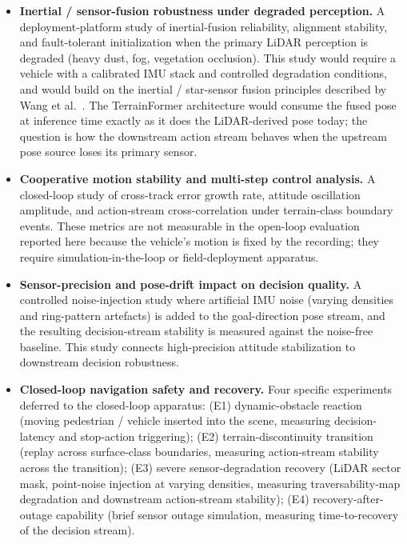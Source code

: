\documentclass[sensors,article,submit,pdftex,moreauthors]{Definitions/mdpi}
\begin{document}
\begin{itemize}
    \item \textbf{Inertial / sensor-fusion robustness under degraded perception.} A deployment-platform study of inertial-fusion reliability, alignment stability, and fault-tolerant initialization when the primary LiDAR perception is degraded (heavy dust, fog, vegetation occlusion). This study would require a vehicle with a calibrated IMU stack and controlled degradation conditions, and would build on the inertial / star-sensor fusion principles described by Wang et al.~\cite{star_inertial_fusion}. The TerrainFormer architecture would consume the fused pose at inference time exactly as it does the LiDAR-derived pose today; the question is how the downstream action stream behaves when the upstream pose source loses its primary sensor.
    \item \textbf{Cooperative motion stability and multi-step control analysis.} A closed-loop study of cross-track error growth rate, attitude oscillation amplitude, and action-stream cross-correlation under terrain-class boundary events. These metrics are not measurable in the open-loop evaluation reported here because the vehicle's motion is fixed by the recording; they require simulation-in-the-loop or field-deployment apparatus.
    \item \textbf{Sensor-precision and pose-drift impact on decision quality.} A controlled noise-injection study where artificial IMU noise (varying densities and ring-pattern artefacts) is added to the goal-direction pose stream, and the resulting decision-stream stability is measured against the noise-free baseline. This study connects high-precision attitude stabilization to downstream decision robustness.
    \item \textbf{Closed-loop navigation safety and recovery.} Four specific experiments deferred to the closed-loop apparatus: (E1) dynamic-obstacle reaction (moving pedestrian / vehicle inserted into the scene, measuring decision-latency and stop-action triggering); (E2) terrain-discontinuity transition (replay across surface-class boundaries, measuring action-stream stability across the transition); (E3) severe sensor-degradation recovery (LiDAR sector mask, point-noise injection at varying densities, measuring traversability-map degradation and downstream action-stream stability); (E4) recovery-after-outage capability (brief sensor outage simulation, measuring time-to-recovery of the decision stream).
\end{itemize}
\end{document}
